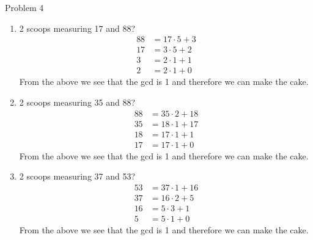 \begin{problem}{Problem 4}
    \begin{Highlight}[Solution]
        \begin{enumerate}[label = (\alph*)]
            \item 2 scoops measuring 17 and 88?
            \begin{align*}
                88 & = 17 \cdot 5 + 3 \\
                17 & = 3 \cdot 5 + 2 \\
                3 & = 2 \cdot 1 + 1 \\
                2 & = 2 \cdot 1 + 0
            \end{align*}
            From the above we see that the gcd is 1 and therefore we can make the cake.
            \item 2 scoops measuring 35 and 88?
            \begin{align*}
                88 & = 35 \cdot 2 + 18 \\
                35 & = 18 \cdot 1 + 17 \\
                18 & = 17 \cdot 1 + 1 \\
                17 & = 17 \cdot 1 + 0
            \end{align*}
            From the above we see that the gcd is 1 and therefore we can make the cake.
            \item 2 scoops measuring 37 and 53?
            \begin{align*}
                53 & = 37 \cdot 1 + 16 \\
                37 & = 16 \cdot 2 + 5 \\
                16 & = 5 \cdot 3 + 1 \\
                5 & = 5 \cdot 1 + 0
            \end{align*}
            From the above we see that the gcd is 1 and therefore we can make the cake.
        \end{enumerate}
    \end{Highlight}
\end{problem}

